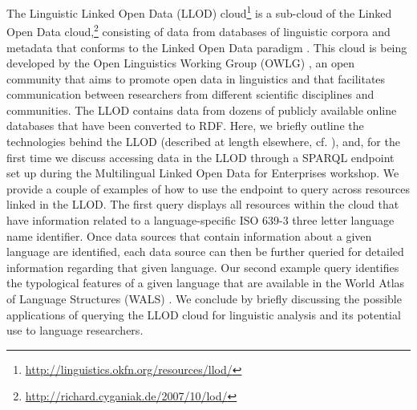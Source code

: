 
The Linguistic Linked Open Data (LLOD) cloud\footnote{\url{http://linguistics.okfn.org/resources/llod/}} is a sub-cloud of the Linked Open Data cloud,\footnote{\url{http://richard.cyganiak.de/2007/10/lod/}} consisting of data from databases of linguistic corpora and metadata that conforms to the Linked Open Data paradigm \citep{bernersLee2006_linkeddata}. This cloud is being developed by the Open Linguistics Working Group (OWLG) \cite{owlg4lrec}, an open community that aims to promote open data in linguistics and that facilitates communication between researchers from different scientific disciplines and communities. The LLOD  contains data from dozens of publicly available online databases that have been converted to RDF. Here, we briefly outline the technologies behind the LLOD (described at length elsewhere, cf. \cite{ldl-llod, ChiarcosLOD}), and, for the first time we discuss accessing data in the LLOD through a SPARQL endpoint set up during the Multilingual Linked Open Data for Enterprises workshop. We provide a couple of examples of how to use the endpoint to query across resources linked in the LLOD. The first query displays all resources within the cloud that have information related to a language-specific ISO 639-3 three letter language name identifier. Once data sources that contain information about a given language are identified, each data source can then be further queried for detailed information regarding that given language. Our second example query identifies the typological features of a given language that are available in the World Atlas of Language Structures (WALS) \citep{Haspelmath_etal2008}. We conclude by briefly discussing the possible applications of querying the LLOD cloud for linguistic analysis and its potential use to language researchers. 
